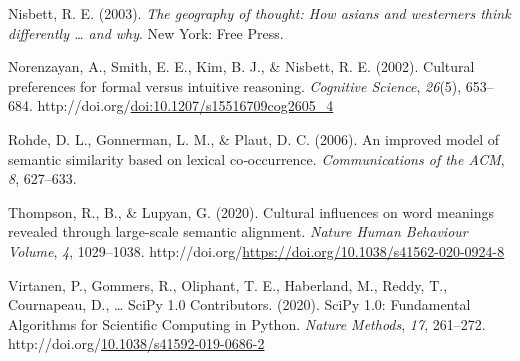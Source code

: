 \documentclass[10pt, letterpaper]{article}
\newenvironment{CSLReferences}%
  {}%
  {\par}
\begin{document}
\begin{CSLReferences}{1}{0}
\leavevmode{}%
Nisbett, R. E. (2003). \emph{The geography of thought: How asians and
westerners think differently \ldots{} and why}. New York: Free Press.

\leavevmode{}%
Norenzayan, A., Smith, E. E., Kim, B. J., \& Nisbett, R. E. (2002).
Cultural preferences for formal versus intuitive reasoning.
\emph{Cognitive Science}, \emph{26}(5), 653--684.
http://doi.org/\href{https://doi.org/doi:10.1207/s15516709cog2605_4}{doi:10.1207/s15516709cog2605\_4}

\leavevmode{}%
Rohde, D. L., Gonnerman, L. M., \& Plaut, D. C. (2006). An improved
model of semantic similarity based on lexical co‐occurrence.
\emph{Communications of the ACM}, \emph{8}, 627--633.

\leavevmode{}%
Thompson, R., B., \& Lupyan, G. (2020). Cultural influences on word
meanings revealed through large-scale semantic alignment. \emph{Nature
Human Behaviour Volume}, \emph{4}, 1029--1038.
http://doi.org/\url{https://doi.org/10.1038/s41562-020-0924-8}

\leavevmode{}%
Virtanen, P., Gommers, R., Oliphant, T. E., Haberland, M., Reddy, T.,
Cournapeau, D., \ldots{} SciPy 1.0 Contributors. (2020). {{SciPy} 1.0:
Fundamental Algorithms for Scientific Computing in Python}. \emph{Nature
Methods}, \emph{17}, 261--272.
http://doi.org/\href{https://doi.org/10.1038/s41592-019-0686-2}{10.1038/s41592-019-0686-2}

\end{CSLReferences}


\end{document}
